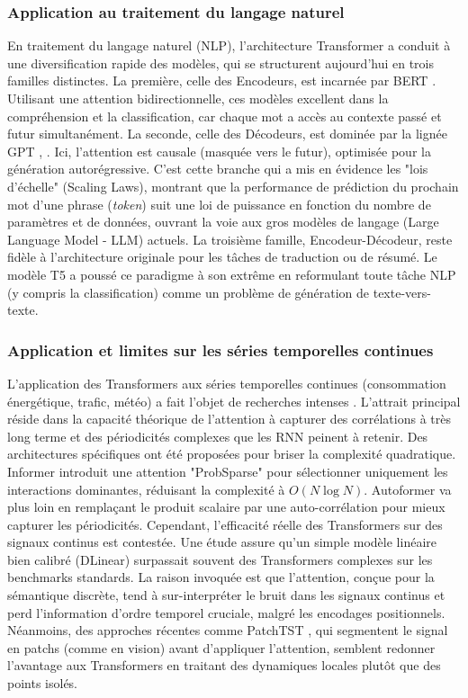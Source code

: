 \subsubsection{Application au traitement du langage naturel}
En traitement du langage naturel (NLP), l'architecture Transformer a conduit à une diversification rapide des modèles, qui se structurent aujourd'hui en trois familles distinctes.
La première, celle des Encodeurs, est incarnée par BERT \cite{devlin_bert_2019}. Utilisant une attention bidirectionnelle, ces modèles excellent dans la compréhension et la classification, car chaque mot a accès au contexte passé et futur simultanément.
La seconde, celle des Décodeurs, est dominée par la lignée GPT \cite{radford_improving_2018}, \cite{brown_language_2020}. Ici, l'attention est causale (masquée vers le futur), optimisée pour la génération autorégressive. C'est cette branche qui a mis en évidence les "lois d'échelle" (Scaling Laws), montrant que la performance de prédiction du prochain mot d'une phrase (\textit{token}) suit une loi de puissance en fonction du nombre de paramètres et de données, ouvrant la voie aux gros modèles de langage (Large Language Model - LLM) actuels.
La troisième famille, Encodeur-Décodeur, reste fidèle à l'architecture originale \cite{vaswani_attention_2017} pour les tâches de traduction ou de résumé. Le modèle T5 \cite{raffel_exploring_2020} a poussé ce paradigme à son extrême en reformulant toute tâche NLP (y compris la classification) comme un problème de génération de texte-vers-texte.

\subsubsection{Application et limites sur les séries temporelles continues}
L'application des Transformers aux séries temporelles continues (consommation énergétique, trafic, météo) a fait l'objet de recherches intenses \cite{wen_transformers_2023}. L'attrait principal réside dans la capacité théorique de l'attention à capturer des corrélations à très long terme et des périodicités complexes que les RNN peinent à retenir.
Des architectures spécifiques ont été proposées pour briser la complexité quadratique. Informer  \cite{zhou_informer_2021} introduit une attention "ProbSparse" pour sélectionner uniquement les interactions dominantes, réduisant la complexité à $O(N \log N)$. Autoformer \cite{wu_autoformer_2021} va plus loin en remplaçant le produit scalaire par une auto-corrélation pour mieux capturer les périodicités.
Cependant, l'efficacité réelle des Transformers sur des signaux continus est contestée. Une étude \cite{zeng_are_2023} assure qu'un simple modèle linéaire bien calibré (DLinear) surpassait souvent des Transformers complexes sur les benchmarks standards. La raison invoquée est que l'attention, conçue pour la sémantique discrète, tend à sur-interpréter le bruit dans les signaux continus et perd l'information d'ordre temporel cruciale, malgré les encodages positionnels. Néanmoins, des approches récentes comme PatchTST \cite{nie_time_2023}, qui segmentent le signal en patchs (comme en vision) avant d'appliquer l'attention, semblent redonner l'avantage aux Transformers en traitant des dynamiques locales plutôt que des points isolés.

